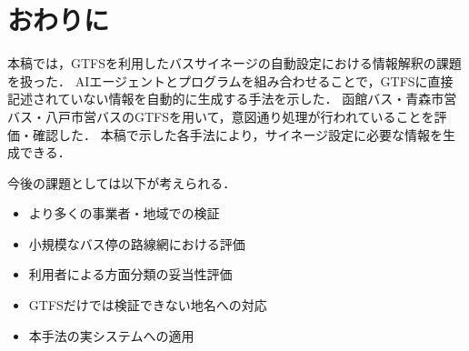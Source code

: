 \section{おわりに}

本稿では，GTFSを利用したバスサイネージの自動設定における情報解釈の課題を扱った．
AIエージェントとプログラムを組み合わせることで，GTFSに直接記述されていない情報を自動的に生成する手法を示した．
函館バス・青森市営バス・八戸市営バスのGTFSを用いて，意図通り処理が行われていることを評価・確認した．
本稿で示した各手法により，サイネージ設定に必要な情報を生成できる．

今後の課題としては以下が考えられる．

\begin{itemize}
    \item より多くの事業者・地域での検証
    \item 小規模なバス停の路線網における評価
    \item 利用者による方面分類の妥当性評価
    \item GTFSだけでは検証できない地名への対応
    \item 本手法の実システムへの適用
\end{itemize}
